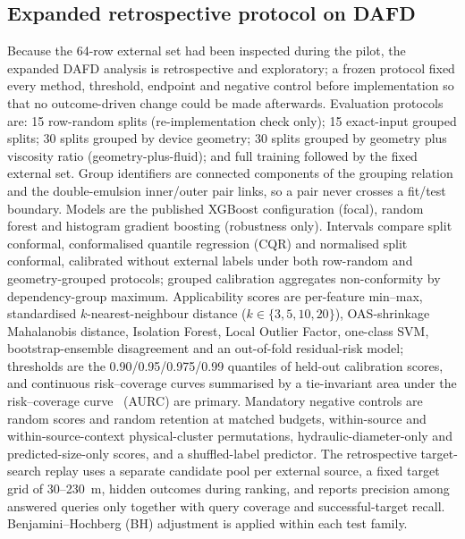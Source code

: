 \documentclass[11pt,a4paper]{article}
\newcommand{\um}{\textmu m}
\begin{document}
\subsection{Expanded retrospective protocol on DAFD}
\label{sec:expanded}
Because the 64-row external set had been inspected during the pilot, the
expanded DAFD analysis is retrospective and exploratory; a frozen protocol
fixed every method, threshold, endpoint and negative control before
implementation so that no outcome-driven change could be made afterwards.
Evaluation protocols are: 15 row-random splits (re-implementation check only); 15
exact-input grouped splits; 30 splits grouped by device geometry; 30 splits grouped by geometry plus viscosity ratio (geometry-plus-fluid); and full training followed by the
fixed external set. Group identifiers are connected components of the grouping
relation and the double-emulsion inner/outer pair links, so a pair never
crosses a fit/test boundary. Models are the published XGBoost configuration
(focal), random forest and histogram gradient boosting (robustness only).
Intervals compare split conformal, conformalised quantile regression (CQR) and
normalised split conformal, calibrated without external labels under both
row-random and geometry-grouped protocols; grouped calibration aggregates
non-conformity by dependency-group maximum. Applicability scores are
per-feature min--max, standardised $k$-nearest-neighbour distance
($k\in\{3,5,10,20\}$), OAS-shrinkage Mahalanobis distance, Isolation Forest,
Local Outlier Factor, one-class SVM, bootstrap-ensemble disagreement and an
out-of-fold residual-risk model; thresholds are the 0.90/0.95/0.975/0.99
quantiles of held-out calibration scores, and continuous risk--coverage curves
summarised by a tie-invariant area under the risk--coverage
curve~\cite{elyaniv2010} (AURC) are
primary. Mandatory negative controls are random
scores and random retention at matched budgets, within-source and
within-source-context physical-cluster permutations, hydraulic-diameter-only
and predicted-size-only scores, and a shuffled-label predictor. The
retrospective target-search replay uses a separate candidate pool per external
source, a fixed target grid of 30--230~\um{}, hidden outcomes during ranking,
and reports precision among answered queries only together with query coverage
and successful-target recall. Benjamini--Hochberg (BH) adjustment is applied
within each test family.
\end{document}
